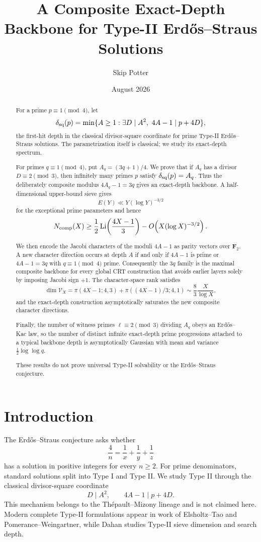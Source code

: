 \documentclass[11pt]{article}
\title{A Composite Exact-Depth Backbone for Type-II Erd\H{o}s--Straus Solutions}
\author{Skip Potter}
\date{August 2026}
\theoremstyle{definition}
\newcommand{\sqdepth}{\delta_{\rm sq}}
\begin{document}
\maketitle

\begin{abstract}
For a prime $p\equiv1\pmod4$, let
\[
\sqdepth(p)=\min\{A\ge1:\exists D\mid A^2,\ 4A-1\mid p+4D\},
\]
the first-hit depth in the classical divisor-square coordinate for prime Type-II Erd\H{o}s--Straus solutions. The parametrization itself is classical; we study its exact-depth spectrum.

For primes $q\equiv1\pmod4$, put $A_q=(3q+1)/4$. We prove that if $A_q$ has a divisor $D\equiv2\pmod3$, then infinitely many primes $p$ satisfy $\sqdepth(p)=A_q$. Thus the deliberately composite modulus $4A_q-1=3q$ gives an exact-depth backbone. A half-dimensional upper-bound sieve gives
\[
E(Y)\ll Y(\log Y)^{-3/2}
\]
for the exceptional prime parameters and hence
\[
N_{\rm comp}(X)\ge \frac12\operatorname{Li}\!\left(\frac{4X-1}{3}\right)
-O\!\left(X(\log X)^{-3/2}\right).
\]

We then encode the Jacobi characters of the moduli $4A-1$ as parity vectors over $\mathbf F_2$. A new character direction occurs at depth $A$ if and only if $4A-1$ is prime or $4A-1=3q$ with $q\equiv1\pmod4$ prime. Consequently the $3q$ family is the maximal composite backbone for every global CRT construction that avoids earlier layers solely by imposing Jacobi sign $+1$. The character-space rank satisfies
\[
\dim\mathcal V_X=
\pi(4X-1;4,3)+\pi((4X-1)/3;4,1)
\sim \frac{8}{3}\frac{X}{\log X},
\]
and the exact-depth construction asymptotically saturates the new composite character directions.

Finally, the number of witness primes $\ell\equiv2\pmod3$ dividing $A_q$ obeys an Erd\H{o}s--Kac law, so the number of distinct infinite exact-depth prime progressions attached to a typical backbone depth is asymptotically Gaussian with mean and variance $\frac12\log\log q$.

These results do not prove universal Type-II solvability or the Erd\H{o}s--Straus conjecture.
\end{abstract}

\section{Introduction}
The Erd\H{o}s--Straus conjecture asks whether
\[
\frac4n=\frac1x+\frac1y+\frac1z
\]
has a solution in positive integers for every $n\ge2$. For prime denominators, standard solutions split into Type I and Type II. We study Type II through the classical divisor-square coordinate
\begin{equation}\label{eq:square}
D\mid A^2,\qquad 4A-1\mid p+4D.
\end{equation}
This mechanism belongs to the Th\'epault--Mizony lineage and is not claimed here. Modern complete Type-II formulations appear in work of Elsholtz--Tao and Pomerance--Weingartner, while Dahan studies Type-II sieve dimension and search depth.
\end{document}
